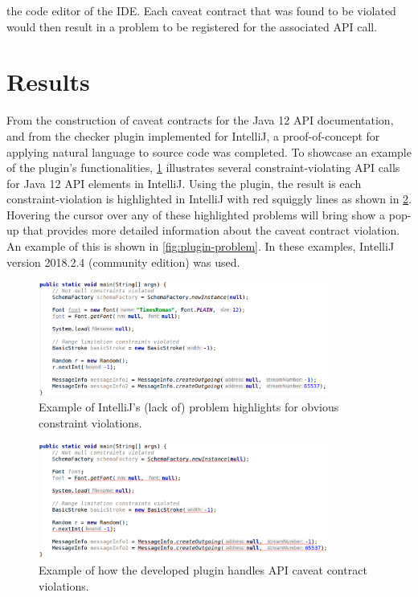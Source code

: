 the code editor of the IDE. Each caveat contract that was found to be violated would then result in a problem to be registered for the associated API call.

\section{Results}
\label{sec:contract-results}
From the construction of caveat contracts for the Java 12 API documentation, and from the checker plugin implemented for IntelliJ, a proof-of-concept for applying natural language to source code was completed. To showcase an example of the plugin's functionalities, \ref{fig:plugin-inspection-off} illustrates several constraint-violating API calls for Java 12 API elements in IntelliJ. Using the plugin, the result is each constraint-violation is highlighted in IntelliJ with red squiggly lines as shown in \ref{fig:plugin-inspection-on}. Hovering the cursor over any of these highlighted problems will bring show a pop-up that provides more detailed information about the caveat contract violation. An example of this is shown in \ref{fig:plugin-problem}. In these examples, IntelliJ version 2018.2.4 (community edition) was used.

\begin{figure}[h]
	\label{fig:plugin-inspection-off}
	\centering
	\includegraphics[width=0.85\textwidth]{figs/plugin-inspection-off.png}
	\caption{Example of IntelliJ's (lack of) problem highlights for obvious constraint violations.}
\end{figure}

\begin{figure}[h]
	\label{fig:plugin-inspection-on}
	\centering
	\includegraphics[width=0.85\textwidth]{figs/plugin-inspection-on.png}
	\caption{Example of how the developed plugin handles API caveat contract violations.}
\end{figure}

